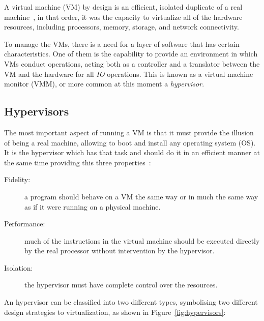 A virtual machine (VM) by design is an efficient, isolated duplicate of a real machine~\cite{Popek1974}, in that order, it was the capacity to virtualize all of the hardware resources, including processors, memory, storage, and network connectivity.

To manage the VMs, there is a need for a layer of software that has certain characteristics. One of them is the capability to provide an environment in which VMs conduct operations, acting both as a controller and a translator between the VM and the hardware for all \textit{IO} operations. This is known as a virtual machine monitor (VMM), or more common at this moment a \textit{hypervisor}.




\subsection{Hypervisors} %
\label{sub:hypervisors}

The most important aspect of running a VM is that it must provide the illusion of being a real machine, allowing to boot and install any operating system (OS). It is the hypervisor which has that task and should do it in an efficient manner at the same time providing this three properties~\cite{Popek1974}:

\begin{description}
	\item[Fidelity:] a program should behave on a VM the same way or in much the same way as if it were running on a physical machine.
	\item[Performance:] much of the instructions in the virtual machine should be executed directly by the real processor without intervention by the hypervisor.
	\item[Isolation:] the hypervisor must have complete control over the resources. 
\end{description}

An hypervisor can be classified into two different types, symbolising two different design strategies to virtualization, as shown in Figure~\ref{fig:hypervisors}:


